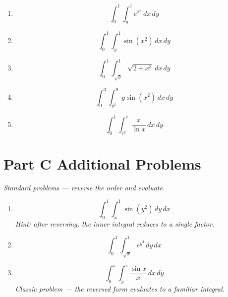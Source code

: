 \documentclass[12pt]{article}
\begin{document}
\begin{enumerate}[label=\textbf{B\arabic*.}, leftmargin=*, itemsep=18pt]

\item %
\[
  \int_0^1 \int_y^1 e^{x^2}\,dx\,dy
\]

\item %
\[
  \int_0^1 \int_y^1 \sin(x^2)\,dx\,dy
\]

\item %
\[
  \int_0^1 \int_{\sqrt{y}}^1 \sqrt{2+x^3}\,dx\,dy
\]

\item %
\[
  \int_0^3 \int_{y^2}^{9} y\sin(x^2)\,dx\,dy
\]

\item %
\[
  \int_0^1 \int_{e^y}^{e} \frac{x}{\ln x}\,dx\,dy
\]

\end{enumerate}

\bigskip
\section*{Part C \quad Additional Problems}
\textit{Standard problems --- reverse the order and evaluate.}

\begin{enumerate}[label=\textbf{C\arabic*.}, leftmargin=*, itemsep=18pt]

\item
\[
  \int_0^1 \int_x^1 \sin(y^2)\,dy\,dx
\]
\textit{Hint: after reversing, the inner integral reduces to a single factor.}

\item
\[
  \int_0^1 \int_{\sqrt{x}}^1 e^{y^3}\,dy\,dx
\]

\item
\[
  \int_0^{\pi} \int_y^{\pi} \frac{\sin x}{x}\,dx\,dy
\]
\textit{Classic problem --- the reversed form evaluates to a familiar integral.}

\end{enumerate}
\end{document}

